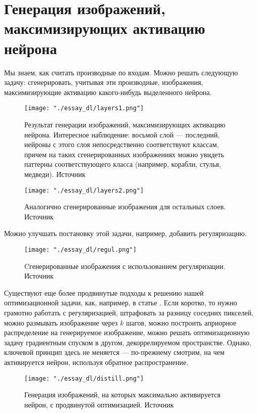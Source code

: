 \documentclass[12pt,fleqn]{article}
\begin{document}
\section{Генерация изображений, максимизирующих активацию нейрона}
Мы знаем, как считать производные по входам. Можно решать следующую задачу: сгенерировать, учитывая эти производные, изображения, максимизирующие активацию какого-нибудь выделенного нейрона.

\begin{figure}[H]
\centering
\texttt{[image: "./essay\_dl/layers1.png"]}
\caption{Результат генерации изображений, максимизирующих активацию нейрона. Интересное наблюдение: восьмой слой --- последний, нейроны с этого слоя непосредственно соответствуют классам, причем на таких сгенерированных изображениях можно увидеть паттерны соответствующего класса (например, корабли, стулья, медведи). Источник \cite{grad3}}
\end{figure}

\begin{figure}[H]
\centering
\texttt{[image: "./essay\_dl/layers2.png"]}
\caption{Аналогично сгенерированные изображения для остальных слоев. Источник \cite{grad3}}
\end{figure}

Можно улучшать постановку этой задачи, например, добавить регуляризацию.

\begin{figure}[H]
\centering
\texttt{[image: "./essay\_dl/regul.png"]}
\caption{Cгенерированные изображения с использованием регуляризации. Источник \cite{grad4}}
\end{figure}

Существуют еще более продвинутые подходы к решению нашей оптимизационной задачи, как, например, в статье \cite{grad5}. Если коротко, то нужно грамотно работать с регуляризацией, штрафовать за разницу соседних пикселей, можно размывать изображение через $k$ шагов, можно построить априорное распределение на генерируемое изображение, можно решать оптимизационную задачу градиентным спуском в другом, декоррелируемом пространстве. Однако, ключевой принцип здесь не меняется --- по-прежнему смотрим, на чем активируется нейрон, используя обратное распространение.

\begin{figure}[H]
\centering
\texttt{[image: "./essay\_dl/distill.png"]}
\caption{Генерация изображений, на которых максимально активируется нейрон, с продвинутой оптимизацией. Источник \cite{grad5}}
\end{figure}
\end{document}

